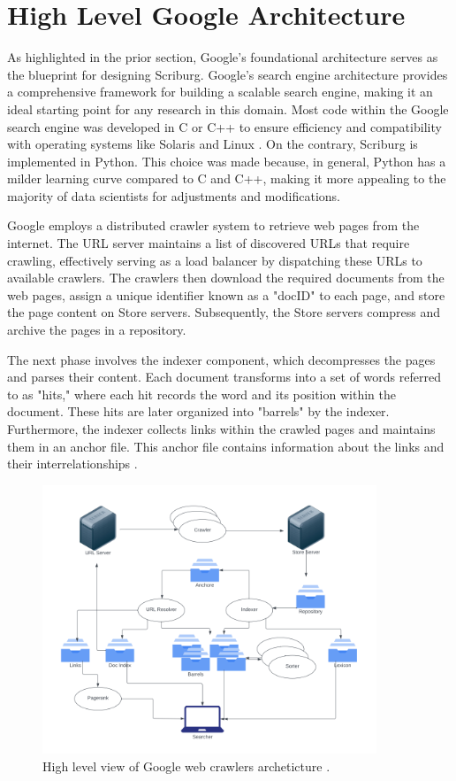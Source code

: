 \section{High Level Google Architecture}\label{sec:high-level-google-architecture}

As highlighted in the prior section, Google's foundational architecture serves as the blueprint for designing Scriburg. Google's search engine architecture provides a comprehensive framework for building a scalable search engine, making it an ideal starting point for any research in this domain. Most code within the Google search engine was developed in C or C++ to ensure efficiency and compatibility with operating systems like Solaris and Linux \cite{google}. On the contrary, Scriburg is implemented in Python. This choice was made because, in general, Python has a milder learning curve compared to C and C++, making it more appealing to the majority of data scientists for adjustments and modifications.

Google employs a distributed crawler system to retrieve web pages from the internet. The URL server maintains a list of discovered URLs that require crawling, effectively serving as a load balancer by dispatching these URLs to available crawlers. The crawlers then download the required documents from the web pages, assign a unique identifier known as a "docID" to each page, and store the page content on Store servers. Subsequently, the Store servers compress and archive the pages in a repository.

The next phase involves the indexer component, which decompresses the pages and parses their content. Each document transforms into a set of words referred to as "hits," where each hit records the word and its position within the document. These hits are later organized into "barrels" by the indexer. Furthermore, the indexer collects links within the crawled pages and maintains them in an anchor file. This anchor file contains information about the links and their interrelationships \cite{google}.


\begin{figure}[h]	
     \centering
     \includegraphics[width=10cm]{images/google_arch.png}
     \caption{High level view of Google web crawlers archeticture \cite{google}.}
     \label{fig:google-arch}
\end{figure}

